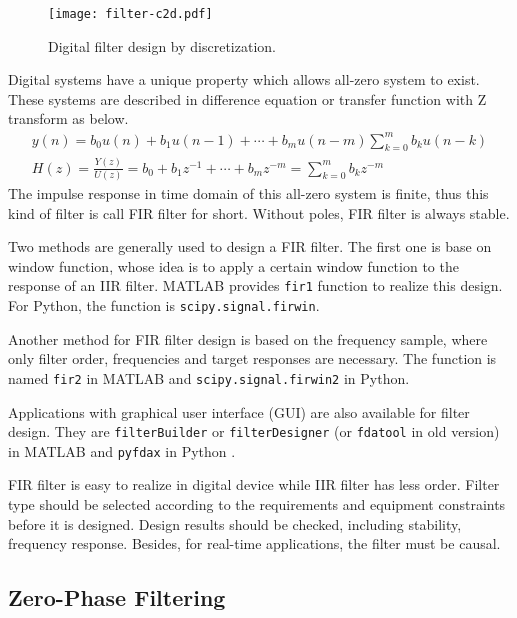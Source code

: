 \begin{figure}[!htb]
    \centering
    \texttt{[image: filter-c2d.pdf]}
    \caption{Digital filter design by discretization.}
    \label{fig:filter-c2d}
\end{figure}


Digital systems have a unique property which allows all-zero system to exist. These systems are described in difference equation or transfer function with Z transform as below.
\begin{gather}
    y(n) = b_0 u(n) + b_1 u(n-1) + \cdots + b_m u(n-m) 
     \sum_{k=0}^{m} b_k u(n-k) \\
    H(z) = \frac{Y(z)}{U(z)} = b_0 + b_1 z^{-1} + \cdots + b_m z^{-m} = \sum_{k=0}^{m} b_k z^{-m}
\end{gather}
The impulse response in time domain of this all-zero system is finite, thus this kind of filter is call FIR filter for short. Without poles, FIR filter is always stable.


Two methods are generally used to design a FIR filter. The first one is base on window function, whose idea is to apply a certain window function to the response of an IIR filter. MATLAB provides \verb|fir1| function to realize this design. For Python, the function is \verb|scipy.signal.firwin|.


Another method for FIR filter design is based on the frequency sample, where only filter order, frequencies and target responses are necessary. The function is named \verb|fir2| in MATLAB and \verb|scipy.signal.firwin2| in Python.


Applications with graphical user interface (GUI) are also available for filter design. They are \verb|filterBuilder| or \verb|filterDesigner| (or \verb|fdatool| in old version) in MATLAB and \verb|pyfdax| in Python \cite{pyfda}.


FIR filter is easy to realize in digital device while IIR filter has less order. Filter type should be selected according to the requirements and equipment constraints before it is designed. Design results should be checked, including stability, frequency response. Besides, for real-time applications, the filter must be causal.




\subsection{Zero-Phase Filtering}


